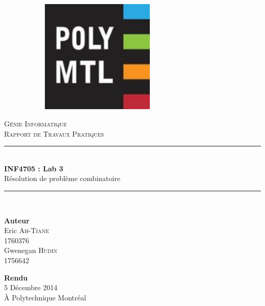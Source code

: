 \documentclass[10pt,a4paper]{article}
\newcommand{\HRule}{\rule{\linewidth}{0.5mm}}
\begin{document}
\begin{titlepage}
	\begin{center}
		\begin{figure}
        \begin{subfigure}[c]{0.2\textwidth}
        		\centering
                \includegraphics[width=0.6\textwidth]{images/logo-polymtl}
        \end{subfigure}
		\end{figure}
		
		
		\vspace{30pt}
		\textsc{\huge Génie Informatique}\\
		\textsc{\LARGE Rapport de Travaux Pratiques}\\		
		\vfill
		
		\HRule \\[0.7cm]
		{\Huge \bfseries INF4705 : Lab 3}\\[0.4cm]
		{\Large Résolution de problème combinatoire}\\[0.2cm]
		\HRule\\[1cm]
		
		\vfill
		
		\begin{minipage}{0.49\textwidth}
			\begin{flushleft} \LARGE
				\textbf{Auteur}\\
				Eric \textsc{Ah-Tiane}\\ 1760376\\
				Gwenegan \textsc{Hudin}\\ 1756642\\[0.5cm]
			\end{flushleft}
		\end{minipage}
		\begin{minipage}{0.49\textwidth}
			\begin{flushright} \LARGE
				\textbf{Rendu}\\
				5 Décembre 2014\\ À Polytechnique Montréal\\[0.5cm]
			\end{flushright}
		\end{minipage}
	\end{center}
\end{titlepage}
\end{document}
